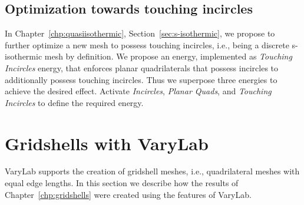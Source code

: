 \documentclass[Thesis.tex]{subfiles}
\begin{document}
\begin{compactenum}[(1)]
\begin{center}
\begin{minipage}{0.9\linewidth}
            \centering
\end{minipage}
\end{center}    
            
\end{compactenum}

\subsection{Optimization towards touching incircles}

In Chapter~\ref{chp:quasiisothermic}, Section~\ref{sec:s-isothermic}, we propose to further optimize a new mesh to possess touching incircles, i.e., being a discrete s-isothermic mesh by definition. We propose an energy, implemented as \emph{Touching Incircles} energy, that enforces planar quadrilaterals that possess incircles to additionally possess touching incircles. Thus we superpose three energies to achieve the desired effect. Activate \emph{Incircles}, \emph{Planar Quads}, and \emph{Touching Incircles} to define the required energy.

\section{Gridshells with {\sc VaryLab}}
\label{sec:gridshells_varylab}

{\sc VaryLab} supports the creation of gridshell meshes, i.e., quadrilateral meshes with equal edge lengths. In this section we describe how the results of Chapter~\ref{chp:gridshells} were created using the features of {\sc VaryLab}.
\end{document}
